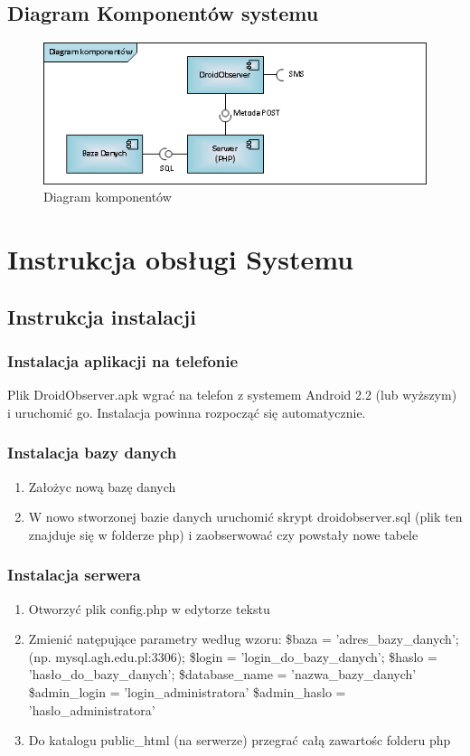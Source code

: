\documentclass[11pt,a4paper]{article}
\begin{document}
\subsection {Diagram Komponentów systemu}
\begin{figure}[h]
    \includegraphics[scale=0.6]{component.png}
    \caption{Diagram komponentów}
 \end{figure}

\newpage
\section {Instrukcja obsługi Systemu}
\subsection{Instrukcja instalacji}

\subsubsection{Instalacja aplikacji na telefonie}
Plik DroidObserver.apk wgrać na telefon z systemem Android 2.2 (lub wyższym) i uruchomić go.
Instalacja powinna rozpocząć się automatycznie.

\subsubsection{Instalacja bazy danych}
\begin{enumerate}
\item Założyc nową bazę danych
\item W nowo stworzonej bazie danych uruchomić skrypt droidobserver.sql (plik ten znajduje się w folderze php) i zaobserwować czy powstały nowe tabele
\end{enumerate}

\subsubsection{Instalacja serwera}
\begin{enumerate}
\item Otworzyć plik config.php w edytorze tekstu
\item Zmienić natępujące parametry według wzoru:
\subitem \$baza = 'adres\_bazy\_danych';  (np. mysql.agh.edu.pl:3306);
\subitem \$login = 'login\_do\_bazy\_danych'; 
\subitem \$haslo = 'hasło\_do\_bazy\_danych';
\subitem \$database\_name = 'nazwa\_bazy\_danych'
\subitem \$admin\_login = 'login\_administratora'
\subitem \$admin\_haslo = 'haslo\_administratora'
\item Do katalogu public\_html (na serwerze) przegrać całą zawartośc folderu php
\end{enumerate}
\end{document}
